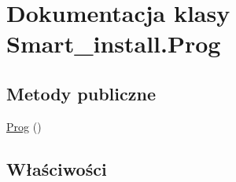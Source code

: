 \hypertarget{class_smart__install_1_1_prog}{\section{Dokumentacja klasy Smart\+\_\+install.\+Prog}
\label{class_smart__install_1_1_prog}
}
\subsection*{Metody publiczne}
\begin{DoxyCompactItemize}
\item 
\hyperlink{class_smart__install_1_1_prog_afb48dfb11267b4c035de65967a88d0b6}{Prog} ()
\end{DoxyCompactItemize}
\subsection*{Właściwości}
